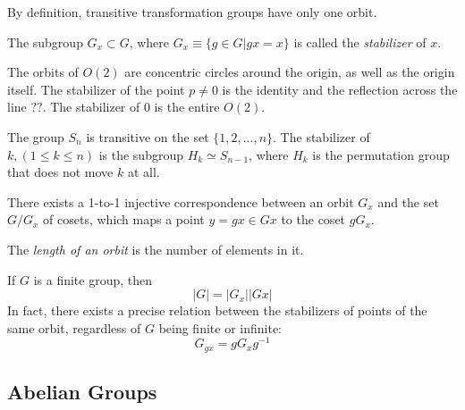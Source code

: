\documentclass{article}
\begin{document}
    By definition, transitive transformation groups have only one orbit.

    \begin{definition}
      The subgroup $G_{x} \subset G$, where $G_{x} \equiv \{ g \in G | g x = x\}$ is called the \textit{stabilizer} of $x$.
    \end{definition}

    \begin{example}
      The orbits of $O(2)$ are concentric circles around the origin, as well as the origin itself. The stabilizer of the point $p \neq 0$ is the identity and the reflection across the line $??$. The stabilizer of $0$ is the entire $O(2)$.
    \end{example}

    \begin{example}
      The group $S_n$ is transitive on the set $\{1, 2, ..., n\}$. The stabilizer of $k, (1 \leq k \leq n)$ is the subgroup $H_{k} \simeq S_{n-1}$, where $H_k$ is the permutation group that does not move $k$ at all. 
    \end{example}

    \begin{theorem}
      There exists a 1-to-1 injective correspondence between an orbit $G_x$ and the set $G / G_{x}$ of cosets, which maps a point $y = g x \in G x $ to the coset $g G_x$. 
    \end{theorem}

    \begin{definition}
      The \textit{length of an orbit} is the number of elements in it. 
    \end{definition}

    \begin{corollary}
      If $G$ is a finite group, then 
      \begin{equation}
        |G| = |G_x| |G x|
      \end{equation}
      In fact, there exists a precise relation between the stabilizers of points of the same orbit, regardless of $G$ being finite or infinite: 
      \begin{equation}
        G_{g x} = g G_{x} g^{-1}
      \end{equation}
    \end{corollary}

  \subsection{Abelian Groups}
\end{document}
